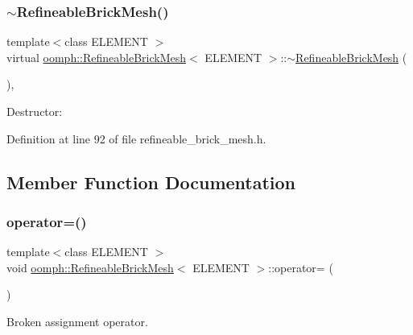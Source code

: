 \subsubsection{\texorpdfstring{$\sim$\+Refineable\+Brick\+Mesh()}{~RefineableBrickMesh()}}
{\footnotesize\ttfamily template$<$class E\+L\+E\+M\+E\+NT $>$ \\
virtual \hyperlink{classoomph_1_1RefineableBrickMesh}{oomph\+::\+Refineable\+Brick\+Mesh}$<$ E\+L\+E\+M\+E\+NT $>$\+::$\sim$\hyperlink{classoomph_1_1RefineableBrickMesh}{Refineable\+Brick\+Mesh} (\begin{DoxyParamCaption}{ }\end{DoxyParamCaption})\hspace{0.3cm}{\ttfamily [inline]}, {\ttfamily [virtual]}}



Destructor\+: 



Definition at line 92 of file refineable\+\_\+brick\+\_\+mesh.\+h.



\subsection{Member Function Documentation}
\mbox{\label{classoomph_1_1RefineableBrickMesh_a72505ccf7f32899ea724c9a2ab1883e0}} 
\subsubsection{\texorpdfstring{operator=()}{operator=()}}
{\footnotesize\ttfamily template$<$class E\+L\+E\+M\+E\+NT $>$ \\
void \hyperlink{classoomph_1_1RefineableBrickMesh}{oomph\+::\+Refineable\+Brick\+Mesh}$<$ E\+L\+E\+M\+E\+NT $>$\+::operator= (\begin{DoxyParamCaption}\item[{const \hyperlink{classoomph_1_1RefineableBrickMesh}{Refineable\+Brick\+Mesh}$<$ E\+L\+E\+M\+E\+NT $>$ \&}]{ }\end{DoxyParamCaption})\hspace{0.3cm}{\ttfamily [inline]}}



Broken assignment operator. 



